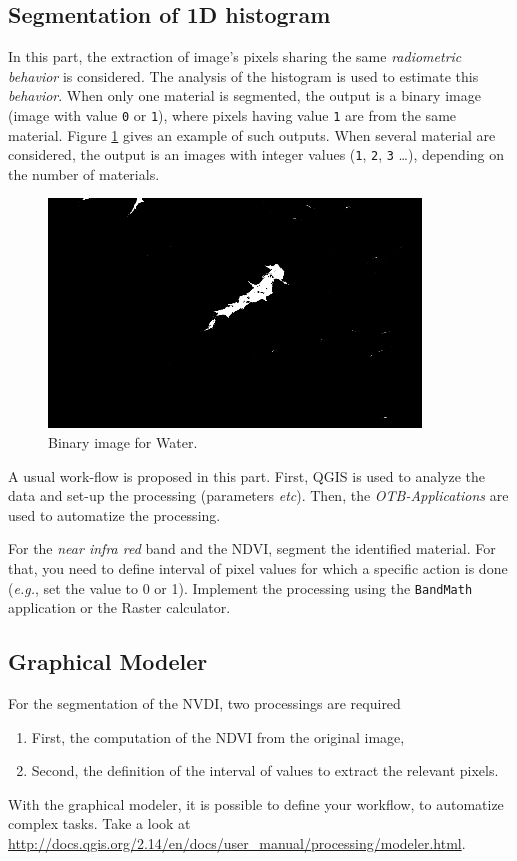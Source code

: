 \documentclass[a4paper,11pt,DIV=18]{scrartcl}
\begin{document}
\subsection{Segmentation of 1D histogram}
\label{sec:org27757ec}
In  this part,  the  extraction  of image's  pixels  sharing the  same
\emph{radiometric behavior} is considered.  The  analysis of the histogram is
used to estimate this \emph{behavior}.   When only one material is segmented,
the output is a  binary image (image with value \texttt{0}  or \texttt{1}), where pixels
having  value \texttt{1}  are from  the same  material.  Figure  \ref{fig:org0a1fd0e}
gives  an  example  of  such   outputs.   When  several  material  are
considered, the output is an images with integer values (\texttt{1}, \texttt{2}, \texttt{3} \ldots{}),
depending on the number of materials.

\begin{figure}[htbp]
\centering
\includegraphics[width=0.65\linewidth]{./figures/quicklook_seg_eau.png}
\caption{\label{fig:org0a1fd0e}
Binary image for Water.}
\end{figure}

A usual  work-flow is proposed  in this part.  First, QGIS is  used to
analyze the data and set-up the processing (parameters \emph{etc}). Then, the
\emph{OTB-Applications} are used to automatize the processing.

\begin{work}
For  the \emph{near  infra red}  band and  the NDVI,  segment the  identified
material. For  that, you need to  define interval of pixel  values for
which a  specific action  is done  (\emph{e.g.}, set  the value  to 0  or 1).
Implement the processing using the  \texttt{BandMath} application or the Raster
calculator.
\end{work}
\subsection{Graphical Modeler}
\label{sec:orgd53e8d8}
For the segmentation of the NVDI, two processings are required
\begin{enumerate}
\item First, the computation of the NDVI from the original image,
\item Second,  the definition of  the interval  of values to  extract the
relevant pixels.
\end{enumerate}
With the graphical modeler, it is possible to define your workflow, to
automatize      complex      tasks.      Take      a      look      at
\url{http://docs.qgis.org/2.14/en/docs/user\_manual/processing/modeler.html}.  
\end{document}
